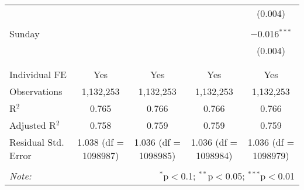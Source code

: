 \documentclass[
]{article}
\begin{document}
\begin{table}[!htbp]
{\begin{tabular}{@{\extracolsep{5pt}}lcccc}
  &  &  &  & (0.004) \\ 
  & & & & \\ 
 Sunday &  &  &  & $-$0.016$^{***}$ \\ 
  &  &  &  & (0.004) \\ 
  & & & & \\ 
\hline \\[-1.8ex] 
Individual FE & Yes & Yes & Yes & Yes \\ 
Observations & 1,132,253 & 1,132,253 & 1,132,253 & 1,132,253 \\ 
R$^{2}$ & 0.765 & 0.766 & 0.766 & 0.766 \\ 
Adjusted R$^{2}$ & 0.758 & 0.759 & 0.759 & 0.759 \\ 
Residual Std. Error & 1.038 (df = 1098987) & 1.036 (df = 1098985) & 1.036 (df = 1098984) & 1.036 (df = 1098979) \\ 
\hline 
\hline \\[-1.8ex] 
\textit{Note:}  & \multicolumn{4}{r}{$^{*}$p$<$0.1; $^{**}$p$<$0.05; $^{***}$p$<$0.01} \\ 
\end{tabular}
} 
\end{table} 
\newpage
\end{document}
